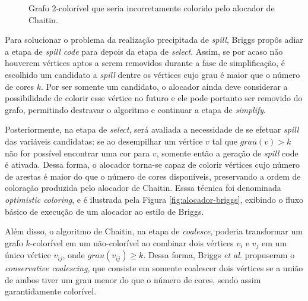 \documentclass[
	12pt,				%
	openright,			%
	twoside,			%
	a4paper,			%
	tcc,			%
	]{ABNT-DC-UEL}
\begin{document}
\begin{figure}[ht]
    \centering
    \caption{Grafo $2$-colorível que seria incorretamente colorido pelo alocador de Chaitin.}
    \label{fig:grafo-diamante}
\end{figure}

Para solucionar o problema da realização precipitada de \textit{spill}, Briggs propôs adiar a etapa de \textit{spill code} para depois da etapa de \textit{select}. Assim, se por acaso não houverem vértices aptos a serem removidos durante a fase de simplificação, é escolhido um candidato a \textit{spill} dentre os vértices cujo grau é maior que o número de cores $k$. Por ser somente um candidato, o alocador ainda deve considerar a possibilidade de colorir esse vértice no futuro e ele pode portanto ser removido do grafo, permitindo destravar o algoritmo e continuar a etapa de \textit{simplify}. 

Posteriormente, na etapa de \textit{select}, será avaliada a necessidade de se efetuar \textit{spill} das variáveis candidatas: se ao desempilhar um vértice $v$ tal que $\mathit{grau}(v)>k$ não for possível encontrar uma cor para $v$, somente então a geração de \textit{spill} code é ativada. Dessa forma, o alocador torna-se capaz de colorir vértices cujo número de arestas é maior do que o número de cores disponíveis, preservando a ordem de coloração produzida pelo alocador de Chaitin. Esssa técnica foi denominada \textit{optimistic coloring}, e é ilustrada pela Figura \ref{fig:alocador-briggs}, exibindo o fluxo básico de execução de um alocador ao estilo de Briggs.

Além disso, o algoritmo de Chaitin, na etapa de \textit{coalesce}, poderia transformar um grafo $k$-colorível em um não-colorível ao combinar dois vértices $v_i$ e $v_j$ em um único vértice $v_{ij}$, onde $grau(v_{ij})\geq k$. Dessa forma, Briggs \textit{et al.} \cite{briggs2:92} propuseram o \textit{conservative coalescing}, que consiste em somente coalescer dois vértices se a união de ambos tiver um grau menor do que o número de cores, sendo assim garantidamente colorível.
\end{document}
